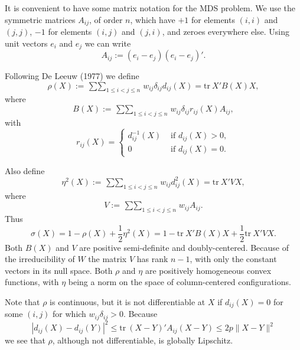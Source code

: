 \documentclass[
  12pt,
]{article}
\begin{document}
It is convenient to have some matrix notation for the MDS problem.
We use the symmetric matrices \(A_{ij}\), of order \(n\), which have \(+1\) for elements \((i,i)\) and \((j,j)\), \(-1\) for elements \((i,j)\) and \((j,i)\), and zeroes everywhere else. Using unit vectors \(e_i\) and \(e_j\) we can write
\begin{equation}
A_{ij}:=(e_i-e_j)(e_i-e_j)'.
\label{eq:adef}
\end{equation}

Following De Leeuw (1977) we define
\begin{equation}
\rho(X):=\mathop{\sum\sum}_{1\leq i<j\leq n} w_{ij}\delta_{ij}d_{ij}(X)=\text{tr}\ X'B(X)X,
\label{eq:rhodef}
\end{equation}
where
\begin{equation}
B(X):=\mathop{\sum\sum}_{1\leq i<j\leq n}w_{ij}\delta_{ij}r_{ij}(X)A_{ij},
\label{eq:bdef}
\end{equation}
with
\begin{equation}
r_{ij}(X)=\begin{cases}
d_{ij}^{-1}(X)&\text{ if }d_{ij}(X)>0,\\
0&\text{ if }d_{ij}(X)=0.
\end{cases}
\label{eq:rdef}
\end{equation}

Also define
\begin{equation}
\eta^2(X):=\mathop{\sum\sum}_{1\leq i<j\leq n}w_{ij}d_{ij}^2(X)=\text{tr}\ X'VX,
\label{eq:etadef}
\end{equation}
where
\begin{equation}
V:=\mathop{\sum\sum}_{1\leq i<j\leq n}w_{ij}A_{ij}.
\label{eq:vdef}
\end{equation}
Thus
\begin{equation}
\sigma(X)=1-\rho(X)+\frac12\eta^2(X)=1-\text{tr}\ X'B(X)X+\frac12\text{tr}\ X'VX.
\label{eq:sform}
\end{equation}
Both \(B(X)\) and \(V\) are positive semi-definite and doubly-centered. Because of the irreducibility of \(W\) the matrix \(V\) has rank \(n-1\), with only the constant vectors in its null space. Both \(\rho\) and \(\eta\) are positively homogeneous convex functions, with \(\eta\) being a norm on the space of column-centered configurations.

Note that \(\rho\) is continuous, but it is not differentiable at \(X\) if
\(d_{ij}(X)=0\) for some \((i,j)\) for which \(w_{ij}\delta_{ij}>0\). Because
\begin{equation}
|d_{ij}(X)-d_{ij}(Y)|^2\leq\text{tr}\ (X-Y)'A_{ij}(X-Y)\leq 2p\|X-Y\|^2
\label{eq:lipschitz}
\end{equation}
we see that \(\rho\), although not differentiable, is globally Lipschitz.
\end{document}
